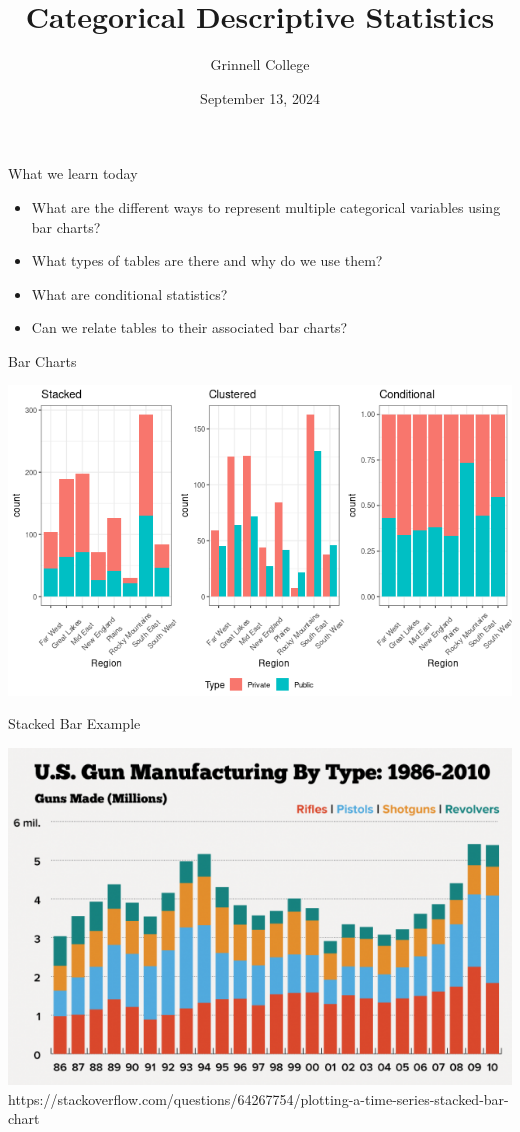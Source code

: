 \documentclass{beamer}
\title[STA-209]{Categorical Descriptive Statistics}
\subtitle{}
\author{Grinnell College}
\date{September 13, 2024}
\begin{document}
\begin{frame}
  \titlepage
\end{frame}



\begin{frame}{What we learn today}
\begin{itemize}
\item What are the different ways to represent multiple categorical variables using bar charts?
\item What types of tables are there and why do we use them?
\item What are conditional statistics?
\item Can we relate tables to their associated bar charts?
\end{itemize}
\end{frame}

\begin{frame}{Bar Charts}

\begin{center}
\includegraphics[scale=0.5]{bar_types.png}
\end{center}
\end{frame}

\begin{frame}{Stacked Bar Example}

\begin{center}
\includegraphics[scale=0.4]{stacked_bar_example.png}
{\tiny https://stackoverflow.com/questions/64267754/plotting-a-time-series-stacked-bar-chart}
\end{center}

\end{frame}
\end{document}

